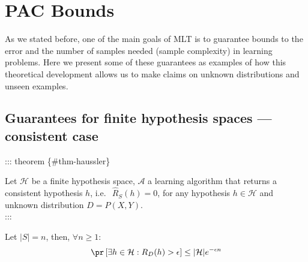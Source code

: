 \documentclass[
  letterpaper,
  12pt,
  british]{tufte-book}
\theoremstyle{plain}
\theoremstyle{definition}
\theoremstyle{plain}
\theoremstyle{remark}
\begin{document}
\hypertarget{pac-bounds}{%
\section{PAC Bounds}\label{pac-bounds}}

As we stated before, one of the main goals of {MLT} is to guarantee
bounds to the error and the number of samples needed (sample complexity)
in learning problems. Here we present some of these guarantees as
examples of how this theoretical development allows us to make claims on
unknown distributions and unseen examples.

\hypertarget{guarantees-for-finite-hypothesis-spaces-consistent-case}{%
\subsection{Guarantees for finite hypothesis spaces --- consistent
case}\label{guarantees-for-finite-hypothesis-spaces-consistent-case}}

::: theorem \{\#thm-haussler\}

Let \(\mathcal{H}\) be a finite hypothesis space, \(\mathcal{A}\) a
learning algorithm that returns a consistent hypothesis \(h\),
i.e.~\(~\hat{R}_{S}(h)=0\), for any hypothesis \(h \in \mathcal{H}\) and
unknown distribution \(D=P(\mathit{X},\mathit{Y})\).\\

:::

Let \(|S|=n\), then, \(\forall n \geq 1\): \begin{align}
        \pr\,[\exists h \in \mathcal{H}: R_{D}(h)>\epsilon]\leq |\mathcal{H}| e^{-\epsilon n}
\end{align}
\end{document}
